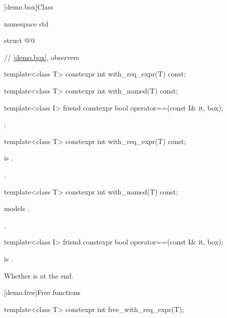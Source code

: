 [demo.box]{Class }

\begin{codeblock}
namespace std {
  struct @@ {
    // \ref{demo.box}, observers

    template<class T> constexpr int with_req_expr(T) const;

    template<class T> constexpr int with_named(T) const;

    template<class I> friend constexpr bool operator==(const I& it, box);
  };
}
\end{codeblock}

%
\begin{itemdecl}
template<class T>
  constexpr int with_req_expr(T) const;
\end{itemdecl}

\begin{itemdescr}
\pnum
\constraints
{} is .

\pnum
\returns
{}.
\end{itemdescr}

%
\begin{itemdecl}
template<class T>
  constexpr int with_named(T) const;
\end{itemdecl}

\begin{itemdescr}
\pnum
\constraints
{} models .

\pnum
\returns
{}.
\end{itemdescr}

%
\begin{itemdecl}
template<class I>
  friend constexpr bool operator==(const I& it, box);
\end{itemdecl}

\begin{itemdescr}
\pnum
\constraints
{} is .

\pnum
\returns
Whether  is at the end.
\end{itemdescr}

[demo.free]{Free functions}

%
\begin{itemdecl}
template<class T>
  constexpr int free_with_req_expr(T);
\end{itemdecl}

